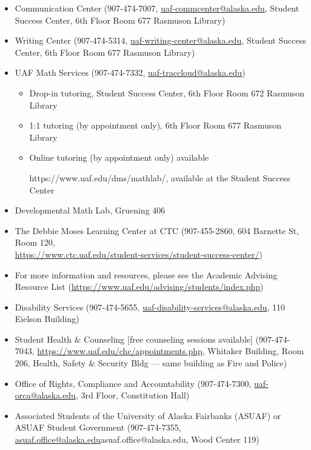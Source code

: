 \documentclass[12pt]{article}
\def\mailto#1{\href{mailto:#1}{#1}}
\begin{document}
\begin{itemize}
\setlength\itemsep{0em}
        \item Communication Center (907-474-7007, \mailto{uaf-commcenter@alaska.edu}, Student Success Center, 6th Floor Room 677 Rasmuson Library)
        \item Writing Center (907-474-5314, \mailto{uaf-writing-center@alaska.edu}, Student Success Center, 6th Floor Room 677 Rasmuson Library)
\item UAF Math Services (907-474-7332, \mailto{uaf-traccloud@alaska.edu})


\begin{itemize}
\item Drop-in tutoring, Student Success Center, 6th Floor Room 672 Rasmuson Library

\item 1:1 tutoring (by appointment only), 6th Floor Room 677 Rasmuson Library

\item Online tutoring (by appointment only) available

https://www.uaf.edu/dms/mathlab/, available at the Student Success Center
\end{itemize}

\item Developmental Math Lab, Gruening 406
\item The Debbie Moses Learning Center at CTC (907-455-2860, 604 Barnette St, Room 120,\\ \url{https://www.ctc.uaf.edu/student-services/student-success-center/})
\item For more information and resources, please see the Academic Advising Resource List (\url{https://www.uaf.edu/advising/students/index.php})
\end{itemize}

\begin{itemize}
\setlength\itemsep{0em}
\item Disability Services (907-474-5655, \mailto{uaf-disability-services@alaska.edu}, 110 Eielson Building)
\item Student Health \& Counseling [free counseling sessions available] (907-474-7043, \url{https://www.uaf.edu/chc/appointments.php}, Whitaker Building, Room 206, Health, Safety \& Security Bldg --- same building as Fire and Police)
\item Office of Rights, Compliance and Accountability (907-474-7300, \mailto{uaf-orca@alaska.edu}, 3rd Floor, Constitution Hall)
\item Associated Students of the University of Alaska Fairbanks (ASUAF) or ASUAF Student Government (907-474-7355, \mailto{asuaf.office@alaska.edu}{asuaf.office@alaska.edu}, Wood Center 119)
\end{itemize}
\end{document}
